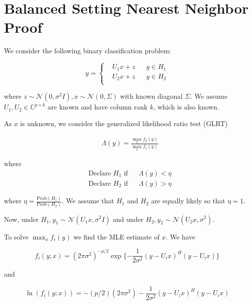 \documentclass[english]{article}
\begin{document}
\section*{Balanced Setting Nearest Neighbor Proof}

We consider the following binary classification problem:

\begin{equation}
y=\left\{
\begin{aligned}
&U_1x+z
&& y\in H_1\\
&U_2x+z
&& y\in H_2\\
\end{aligned}\right.
\end{equation}

where $z\sim\mathcal{N}(0,\sigma^2I), x\sim\mathcal{N}(0,\Sigma)$ with known diagonal $\Sigma$. We assume $U_1,U_2\in\mathbb{C}^{p\times k}$ are known and have column rank $k$, which is also known.

As $x$ is unknown, we consider the generalized likelihood ratio test (GLRT)

\begin{equation}\label{eq:glrt}
\begin{aligned}
&\Lambda(y)=\frac{\max_xf_2(y)}{\max_xf_1(y)}
\end{aligned}
\end{equation}

where
\begin{equation}
\begin{aligned}
&\text{Declare } H_1 \text{ if}
&& \Lambda(y) < \eta\\
& \text{Declare } H_2 \text{ if}
&& \Lambda(y) > \eta
\end{aligned}
\end{equation}

where $\eta = \frac{\text{Prob}(H_1)}{\text{Prob}(H_2)}$. We assume that $H_1$ and $H_2$ are equally likely so that $\eta = 1$.

Now, under $H_1,y_1\sim\mathcal{N}(U_1x,\sigma^2I)$ and under $H_2,y_2\sim\mathcal{N}(U_2x,\sigma^2)$.

To solve $\max_xf_i(y)$ we find the MLE estimate of $x$. We have

\begin{equation}
f_i(y;x) = (2\pi\sigma^2)^{-p/2}\exp\{-\frac{1}{2\sigma^2}(y-U_ix)^H(y-U_ix)\}
\end{equation}

and

\begin{equation}\label{eq:log like}
\ln(f_i(y;x)) = -(p/2)(2\pi\sigma^2)-\frac{1}{2\sigma^2}(y-U_ix)^H(y-U_ix)
\end{equation}
\end{document}
